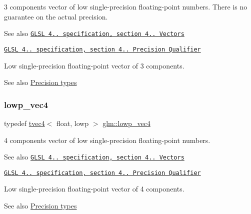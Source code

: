 3 components vector of low single-\/precision floating-\/point numbers. There is no guarantee on the actual precision.

\begin{DoxySeeAlso}{See also}
\href{http://www.opengl.org/registry/doc/GLSLangSpec.4.20.8.pdf}{\tt G\+L\+SL 4.. specification, section 4.. Vectors} 

\href{http://www.opengl.org/registry/doc/GLSLangSpec.4.20.8.pdf}{\tt G\+L\+SL 4.. specification, section 4.. Precision Qualifier}
\end{DoxySeeAlso}
Low single-\/precision floating-\/point vector of 3 components. \begin{DoxySeeAlso}{See also}
\hyperlink{group__core__precision}{Precision types} 
\end{DoxySeeAlso}
\mbox{\label{group__core__precision_gabb82786cbefa101e9eb0cff63cecb1f2}} 
\subsubsection{\texorpdfstring{lowp\+\_\+vec4}{lowp\_vec4}}
{\footnotesize\ttfamily typedef \hyperlink{structglm_1_1tvec4}{tvec4}$<$ float, lowp $>$ \hyperlink{group__core__precision_gabb82786cbefa101e9eb0cff63cecb1f2}{glm\+::lowp\+\_\+vec4}}

4 components vector of low single-\/precision floating-\/point numbers.

\begin{DoxySeeAlso}{See also}
\href{http://www.opengl.org/registry/doc/GLSLangSpec.4.20.8.pdf}{\tt G\+L\+SL 4.. specification, section 4.. Vectors} 

\href{http://www.opengl.org/registry/doc/GLSLangSpec.4.20.8.pdf}{\tt G\+L\+SL 4.. specification, section 4.. Precision Qualifier}
\end{DoxySeeAlso}
Low single-\/precision floating-\/point vector of 4 components. \begin{DoxySeeAlso}{See also}
\hyperlink{group__core__precision}{Precision types} 
\end{DoxySeeAlso}
\mbox{\label{group__core__precision_gaf46a55555e71730f77b5c885d20ae8e2}} 
